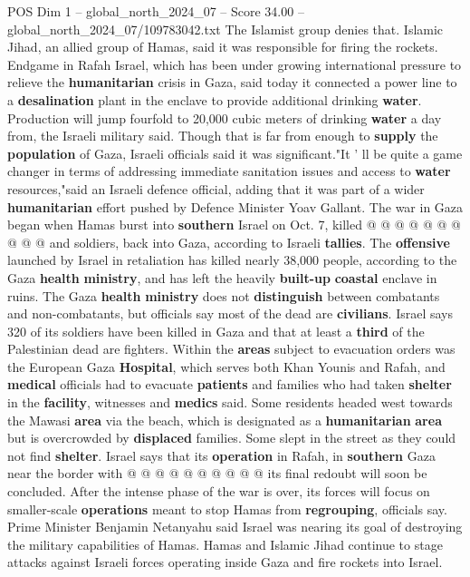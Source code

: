\begin{textsample}{POS Dim 1 – global\_north\_2024\_07 – Score 34.00 – global\_north\_2024\_07/109783042.txt}
The Islamist group denies that.
Islamic Jihad, an allied group of Hamas, said it was responsible for firing the rockets.
Endgame in Rafah Israel, which has been under growing international pressure to relieve the \textbf{humanitarian} crisis in Gaza, said today it connected a power line to a \textbf{desalination} plant in the enclave to provide additional drinking \textbf{water}.
Production will jump fourfold to 20,000 cubic meters of drinking \textbf{water} a day from, the Israeli military said.
Though that is far from enough to \textbf{supply} the \textbf{population} of Gaza, Israeli officials said it was significant."It ' ll be quite a game changer in terms of addressing immediate sanitation issues and access to \textbf{water} resources,"said an Israeli defence official, adding that it was part of a wider \textbf{humanitarian} effort pushed by Defence Minister Yoav Gallant.
The war in Gaza began when Hamas burst into \textbf{southern} Israel on Oct. 7, killed @ @ @ @ @ @ @ @ @ @ and soldiers, back into Gaza, according to Israeli \textbf{tallies}.
The \textbf{offensive} launched by Israel in retaliation has killed nearly 38,000 people, according to the Gaza \textbf{health} \textbf{ministry}, and has left the heavily \textbf{built-up} \textbf{coastal} enclave in ruins.
The Gaza \textbf{health} \textbf{ministry} does not \textbf{distinguish} between combatants and non-combatants, but officials say most of the dead are \textbf{civilians}.
Israel says 320 of its soldiers have been killed in Gaza and that at least a \textbf{third} of the Palestinian dead are fighters.
Within the \textbf{areas} subject to evacuation orders was the European Gaza \textbf{Hospital}, which serves both Khan Younis and Rafah, and \textbf{medical} officials had to evacuate \textbf{patients} and families who had taken \textbf{shelter} in the \textbf{facility}, witnesses and \textbf{medics} said.
Some residents headed west towards the Mawasi \textbf{area} via the beach, which is designated as a \textbf{humanitarian} \textbf{area} but is overcrowded by \textbf{displaced} families.
Some slept in the street as they could not find \textbf{shelter}.
Israel says that its \textbf{operation} in Rafah, in \textbf{southern} Gaza near the border with @ @ @ @ @ @ @ @ @ @ its final redoubt will soon be concluded.
After the intense phase of the war is over, its forces will focus on smaller-scale \textbf{operations} meant to stop Hamas from \textbf{regrouping}, officials say.
Prime Minister Benjamin Netanyahu said Israel was nearing its goal of destroying the military capabilities of Hamas.
Hamas and Islamic Jihad continue to stage attacks against Israeli forces operating inside Gaza and fire rockets into Israel.

\end{textsample}
